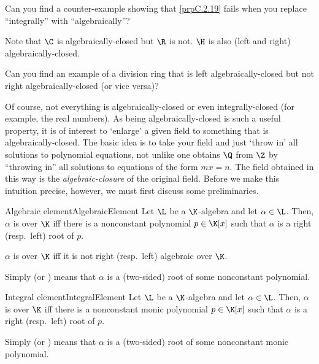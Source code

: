 \begin{exr}{}{}
	Can you find a counter-example showing that \cref{prpC.2.19} fails when you replace ``integrally'' with ``algebraically''?
\end{exr}
\begin{exm}{}{}
	Note that $\C$ is algebraically-closed but $\R$ is not.  $\H$ is also (left and right) algebraically-closed.
\end{exm}
\begin{exr}{}{}
	Can you find an example of a division ring that is left algebraically-closed but not right algebraically-closed (or vice versa)?
\end{exr}
Of course, not everything is algebraically-closed or even integrally-closed (for example, the real numbers).  As being algebraically-closed is such a useful property, it is of interest to `enlarge' a given field to something that is algebraically-closed.  The basic idea is to take your field and just `throw in' all solutions to polynomial equations, not unlike one obtains $\Q$ from $\Z$ by ``throwing in'' all solutions to equations of the form $mx=n$.  The field obtained in this way is the \emph{algebraic-closure} of the original field.  Before we make this intuition precise, however, we must first discuss some preliminaries.
\begin{dfn}{Algebraic element}{AlgebraicElement}
	Let $\L$ be a $\K$-algebra and let $\alpha \in \L$.  Then, $\alpha$ is  over $\K$ iff there is a nonconstant polynomial $p\in \K [x]$ such that $\alpha$ is a right (resp.~left) root of $p$.
	
	$\alpha$ is  over $\K$ iff it is not right (resp.~left) algebraic over $\K$.
	\begin{rmk}
		Simply  (or ) means that $\alpha$ is a (two-sided) root of some nonconstant polynomial.
	\end{rmk}
\end{dfn}
\begin{dfn}{Integral element}{IntegralElement}
	Let $\L$ be a $\K$-algebra and let $\alpha \in \L$.  Then, $\alpha$ is  over $\K$ iff there is a nonconstant monic polynomial $p\in \K [x]$ such that $\alpha$ is a right (resp.~left) root of $p$.
	\begin{rmk}
		Simply  (or ) means that $\alpha$ is a (two-sided) root of some nonconstant monic polynomial.
	\end{rmk}
\end{dfn}
